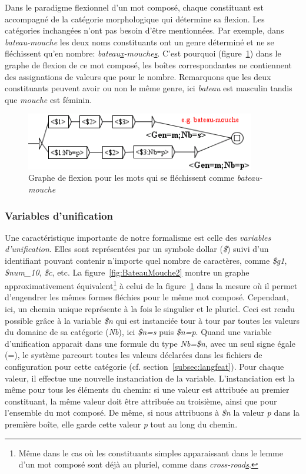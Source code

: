 \bigskip
\noindent Dans le paradigme flexionnel d'un mot composé, chaque constituant est accompagné de la
catégorie morphologique qui détermine sa flexion. Les catégories inchangées n'ont pas besoin d'être
mentionnées. Par exemple, dans \emph{bateau-mouche} les deux noms constituants ont un genre
déterminé et ne se fléchissent qu'en nombre: \emph{bateau\underline{x}-mouche\underline{s}}. C'est
pourquoi (figure~\ref{fig:BateauMouche1}) dans le graphe de flexion de ce mot composé, les boîtes
correspondantes ne contiennent des assignations de  valeurs que pour le nombre. Remarquons que les
deux  constituants peuvent avoir ou non le même genre, ici \emph{bateau} est masculin tandis que
\emph{mouche} est féminin.

\begin{figure}[!htb]
  \centering
  \includegraphics[width=10cm]{resources/img/BateauMouche1.png}
  \caption{Graphe de flexion pour les mots qui se fléchissent comme \emph{bateau-mouche}}
  \label{fig:BateauMouche1}
\end{figure}

\subsubsection{Variables d'unification}
Une caractéristique importante de notre formalisme est celle des \textit{variables d'unification}.
Elles sont représentées par un symbole dollar (\emph{\$}) suivi d'un identifiant pouvant
contenir n'importe quel nombre de caractères, comme \emph{\$g1}, \emph{\$num\_10}, \emph{\$c}, etc.
La figure~\ref{fig:BateauMouche2} montre un graphe approximativement équivalent\footnote{Même dans
le cas où les constituants simples apparaissant dans le lemme d'un mot composé sont déjà au
pluriel, comme dans \emph{cross-road\underline{s}}.} à celui de la figure~\ref{fig:BateauMouche1}
dans la mesure où il permet d'engendrer les mêmes formes fléchies pour le même mot composé.
Cependant, ici, un chemin unique représente à la fois le singulier et le pluriel. Ceci est rendu
possible grâce à la variable \emph{\$n} qui est instanciée tour à tour par toutes les valeurs du
domaine de sa catégorie (\emph{Nb}), ici \emph{\$n=s} puis \emph{\$n=p}.
Quand une variable d'unification apparait dans une formule du type \emph{Nb=\$n}, avec un seul signe égale
(=), le système parcourt toutes les valeurs déclarées dans les fichiers de configuration pour cette
catégorie (cf. section~\ref{subsec:langfeat}). Pour chaque valeur, il effectue une nouvelle instanciation
de la variable. L'instanciation est la même
pour tous les éléments du chemin: si une valeur est attribuée au premier constituant, la même valeur
doit être attribuée au troisième, ainsi que pour l'ensemble du mot composé. De même, si nous
attribuons à \emph{\$n} la valeur \emph{p} dans la première boîte, elle garde cette valeur \emph{p}
tout au long du chemin.

